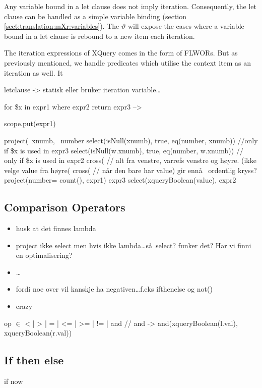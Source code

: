 Any variable bound in a \textsf{let} clause does not imply iteration. Consequently, the \textsf{let} clause can be
handled as a simple variable binding (section \ref{sect:translation:mXr:variables}). The $\vartheta$ will expose
the cases where a variable bound in a \textsf{let} clause is rebound to a new item each iteration.





The iteration expressions of XQuery comes in the form of FLWORs. But as
previously mentioned, we handle predicates which utilise the context item as an
iteration as well. It 


letclause -> statisk eller bruker iteration variable\ldots

for \$x in expr1 where expr2 return expr3  -->

scope.put(expr1)

project(~xnumb, ~number
    select(isNull(xnumb), true, eq(number, xnumb))             
    //only if \$x is  used in expr3 
    select(isNull(w.xnumb), true, eq(number, w.xnumb))         
    // only if \$x is used in expr2 
        cross(                     
    // alt fra venstre, varrefs venstre og høyre. (ikke velge value fra h\o yre(
            cross(                                             
          //  n\aa r den bare har value) gir enn\aa~ ordentlig kryss?
                project(number= count(), 
                    expr1)
                expr3
        select(xqueryBoolean(value),                                  
            expr2

\subsection{Comparison Operators}
\label{sect:translation:mXr:compOps}

\begin{itemize}
  \item husk at det finnes lambda
  \item project ikke select men hvis ikke lambda\ldots s\aa~select? funker det? Har vi finni en optimalisering?
  \item \ldots
  \item fordi noe over vil kanskje ha negativen\ldots f.eks ifthenelse og not()
  \item crazy
\end{itemize}
op $\in$ {< | > | = | <= | >= | != | and }        // and ->
and(xqueryBoolean(l.val), xqueryBoolean(r.val))

\subsection{If then else}
\label{sect:translation:ifThenElse}
if
now

